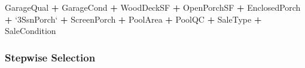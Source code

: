 \documentclass[american,]{article}
\newenvironment{Shaded}{\begin{snugshade}}{\end{snugshade}}
\newcommand{\DataTypeTok}[1]{\textcolor[rgb]{0.13,0.29,0.53}{#1}}
\newcommand{\NormalTok}[1]{#1}
\newcommand{\OperatorTok}[1]{\textcolor[rgb]{0.81,0.36,0.00}{\textbf{#1}}}
\newcommand{\StringTok}[1]{\textcolor[rgb]{0.31,0.60,0.02}{#1}}
\begin{document}
\begin{Shaded}
\begin{Highlighting}[]
\StringTok{           }\NormalTok{GarageQual }\OperatorTok{+}\StringTok{ }\NormalTok{GarageCond }\OperatorTok{+}\StringTok{ }\NormalTok{WoodDeckSF }\OperatorTok{+}\StringTok{ }\NormalTok{OpenPorchSF }\OperatorTok{+}\StringTok{ }\NormalTok{EnclosedPorch }\OperatorTok{+}
\StringTok{           `}\DataTypeTok{3SsnPorch}\StringTok{`} \OperatorTok{+}\StringTok{ }\NormalTok{ScreenPorch }\OperatorTok{+}\StringTok{ }\NormalTok{PoolArea }\OperatorTok{+}\StringTok{ }\NormalTok{PoolQC }\OperatorTok{+}\StringTok{ }\NormalTok{SaleType }\OperatorTok{+}
\StringTok{           }\NormalTok{SaleCondition}
\end{Highlighting}
\end{Shaded}

\newpage

\hypertarget{stepwise-selection}{%
\subsubsection{Stepwise Selection}\label{stepwise-selection}}

\label{appendix:stepWSelection}
\end{document}
